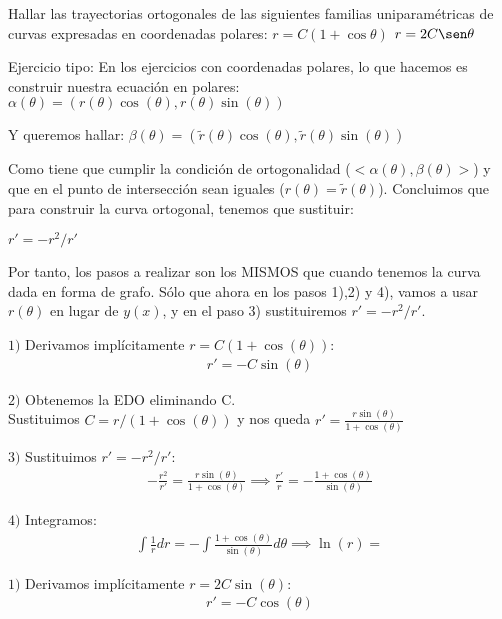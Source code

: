 \documentclass[nochap]{apuntes}
\begin{document}
\begin{problem}[11]
Hallar las trayectorias ortogonales de las siguientes familias uniparamétricas de curvas expresadas en coordenadas polares:
\ppart
$r=C(1+\cos \theta)$
\ppart
$r=2C\sen \theta$

\solution

\begin{expla}
Ejercicio tipo: En los ejercicios con coordenadas polares, lo que hacemos es construir nuestra ecuación en polares:
$\alpha(\theta)=(r(\theta)\cos(\theta),r(\theta)\sin(\theta))$

Y queremos hallar:
$\beta(\theta)=(\tilde{r}(\theta)\cos(\theta),\tilde{r}(\theta)\sin(\theta))$

Como tiene que cumplir la condición de ortogonalidad ($<\alpha(\theta), \beta(\theta)>$) y que en el punto de intersección sean iguales ($r(\theta)=\tilde{r}(\theta)$). Concluimos que para construir la curva ortogonal, tenemos que sustituir:

$r' = -r^2/r'$

Por tanto, los pasos a realizar son los MISMOS que cuando tenemos la curva dada en forma de grafo. Sólo que ahora en los pasos 1),2) y 4), vamos a usar $r(\theta)$ en lugar de $y(x)$, y en el paso 3) sustituiremos $r'=-r^2/r'$. 

\end{expla}

\spart
$1)$ Derivamos implícitamente $r=C(1+\cos(\theta))$:
\begin{gather*}
r'=-C\sin(\theta)
\end{gather*}

$2)$ Obtenemos la EDO eliminando C.\\
Sustituimos $C=r/(1+\cos(\theta))$ y nos queda $r'=\frac{r\sin(\theta)}{1+\cos(\theta)}$

$3)$ Sustituimos  $r'=-r^2/r'$:
\begin{gather*}
-\frac{r^2}{r'}=\frac{r\sin(\theta)}{1+\cos(\theta)} \implies \frac{r'}{r}=-\frac{1+\cos(\theta)}{\sin(\theta)}
\end{gather*}

$4)$ Integramos:
\begin{gather*}
\int \frac{1}{r}dr=-\int\frac{1+\cos(\theta)}{\sin(\theta)}d\theta \implies \ln(r)=
\end{gather*}

\spart
$1)$ Derivamos implícitamente $r=2C\sin(\theta)$:
\begin{gather*}
r'=-C\cos(\theta)
\end{gather*}


\end{problem}
\end{document}
